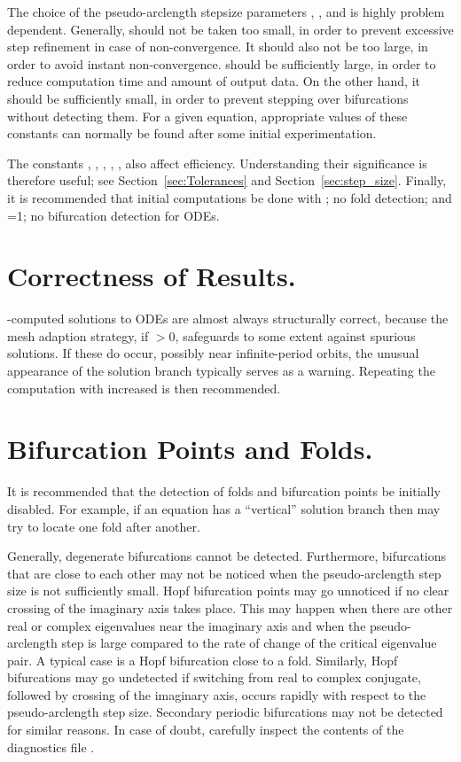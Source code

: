 The choice of the pseudo-arclength stepsize parameters
, , and 
is highly problem dependent.
Generally,  should not be taken too small,
in order to prevent excessive step refinement in case of non-convergence.
It should also not be too large, in order to avoid instant non-convergence.
 should be sufficiently large, in order to reduce computation time
and amount of output data.
On the other hand, it should be sufficiently small, in order to prevent
stepping over bifurcations without detecting them.
For a given equation, appropriate values of these constants 
can normally be found after some initial experimentation.

The constants , , , , ,  
also affect efficiency.
Understanding their significance is therefore useful; 
see Section~\ref{sec:Tolerances} and Section~\ref{sec:step_size}.
Finally, it is recommended that initial computations be done with 
; no fold detection;
and =1; no bifurcation detection for ODEs.
 
\section{ Correctness of Results.} \label{sec:Correctness}
\AUTO-computed solutions to ODEs are almost always structurally correct,
because the mesh adaption strategy, if $>$0, safeguards to some extent
against spurious solutions.
If these do occur, possibly near infinite-period orbits,
the unusual appearance of the solution branch typically serves as a warning.
Repeating the computation with increased  is then recommended.

\section{ Bifurcation Points and Folds.} \label{sec:Bifurcations}
It is recommended that the detection of folds 
and bifurcation points be initially disabled.
For example, if an equation has a ``vertical'' solution branch
then \AUTO may try to locate one fold after another.

Generally, degenerate bifurcations cannot be detected.
Furthermore, bifurcations that are close to each other may not
be noticed when the pseudo-arclength step size is not sufficiently small.
Hopf bifurcation points may go unnoticed if no clear crossing of
the imaginary axis takes place. This may happen when there are other
real or complex eigenvalues near the imaginary axis and when 
the pseudo-arclength step is large compared to the rate
of change of the critical eigenvalue pair.
A typical  case is a Hopf bifurcation close to a fold.
Similarly, Hopf bifurcations may go undetected if switching from
real to complex conjugate, followed by crossing of the imaginary
axis, occurs rapidly with respect to the pseudo-arclength step size.
Secondary periodic bifurcations may not be detected for similar reasons.
In case of doubt, carefully inspect the contents of the diagnostics file
.
 
